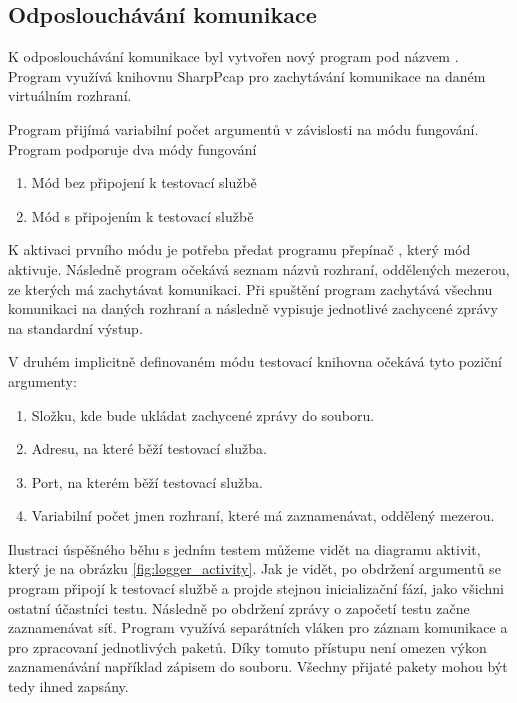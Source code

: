\subsection{Odposlouchávání komunikace}

K odposlouchávání komunikace byl vytvořen nový program pod názvem . Program využívá knihovnu SharpPcap\cite{sharppcap} pro zachytávání komunikace na daném virtuálním rozhraní. 

Program přijímá variabilní počet argumentů v závislosti na módu fungování. Program podporuje dva módy fungování

\begin{enumerate}
    \item Mód bez připojení k testovací službě
    \item Mód s připojením k testovací službě
\end{enumerate}

K aktivaci prvního módu je potřeba předat programu přepínač , který mód aktivuje. Následně program očekává seznam názvů rozhraní, oddělených mezerou, ze kterých má zachytávat komunikaci. Při spuštění program zachytává všechnu komunikaci na daných rozhraní a následně vypisuje jednotlivé zachycené zprávy na standardní výstup.

V druhém implicitně definovaném módu testovací knihovna očekává tyto poziční argumenty:

\begin{enumerate}
    \item Složku, kde bude ukládat zachycené zprávy do souboru.
    \item Adresu, na které běží testovací služba.
    \item Port, na kterém běží testovací služba.
    \item Variabilní počet jmen rozhraní, které má zaznamenávat, oddělený mezerou.
\end{enumerate}

Ilustraci úspěšného běhu s jedním testem můžeme vidět na diagramu aktivit, který je na obrázku \ref{fig:logger_activity}. Jak je vidět, po obdržení argumentů se program připojí k testovací službě a projde stejnou inicializační fází, jako všichni ostatní účastníci testu. Následně po obdržení zprávy o započetí testu začne zaznamenávat síť. Program využívá separátních vláken pro záznam komunikace a pro zpracovaní jednotlivých paketů. Díky tomuto přístupu není omezen výkon zaznamenávání například zápisem do souboru. Všechny přijaté pakety mohou být tedy ihned zapsány. 

